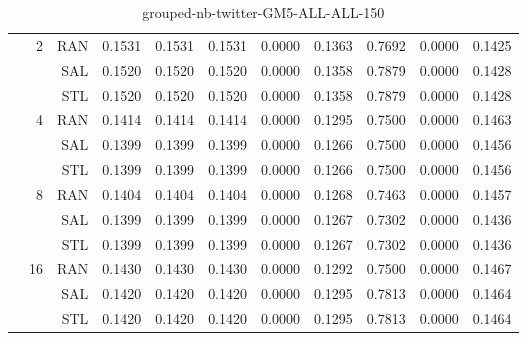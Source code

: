 \begin{center}
\begin{table}[htbp]
\begin{center}
\begin{tabular}{ | r | r | r | r | r | r | r | r | r | r | r |}
 & \multirow{3}{*}{2} & RAN & 0.1531 & 0.1531 & 0.1531 & 0.0000 & 0.1363 & 0.7692 & 0.0000 & 0.1425\\ \cline{3-11}
 &   & SAL & 0.1520 & 0.1520 & 0.1520 & 0.0000 & 0.1358 & 0.7879 & 0.0000 & 0.1428\\ \cline{3-11}
 &   & STL & 0.1520 & 0.1520 & 0.1520 & 0.0000 & 0.1358 & 0.7879 & 0.0000 & 0.1428\\ \cline{2-11}
 & \multirow{3}{*}{4} & RAN & 0.1414 & 0.1414 & 0.1414 & 0.0000 & 0.1295 & 0.7500 & 0.0000 & 0.1463\\ \cline{3-11}
 &   & SAL & 0.1399 & 0.1399 & 0.1399 & 0.0000 & 0.1266 & 0.7500 & 0.0000 & 0.1456\\ \cline{3-11}
 &   & STL & 0.1399 & 0.1399 & 0.1399 & 0.0000 & 0.1266 & 0.7500 & 0.0000 & 0.1456\\ \cline{2-11}
 & \multirow{3}{*}{8} & RAN & 0.1404 & 0.1404 & 0.1404 & 0.0000 & 0.1268 & 0.7463 & 0.0000 & 0.1457\\ \cline{3-11}
 &   & SAL & 0.1399 & 0.1399 & 0.1399 & 0.0000 & 0.1267 & 0.7302 & 0.0000 & 0.1436\\ \cline{3-11}
 &   & STL & 0.1399 & 0.1399 & 0.1399 & 0.0000 & 0.1267 & 0.7302 & 0.0000 & 0.1436\\ \cline{2-11}
 & \multirow{3}{*}{16} & RAN & 0.1430 & 0.1430 & 0.1430 & 0.0000 & 0.1292 & 0.7500 & 0.0000 & 0.1467\\ \cline{3-11}
 &   & SAL & 0.1420 & 0.1420 & 0.1420 & 0.0000 & 0.1295 & 0.7813 & 0.0000 & 0.1464\\ \cline{3-11}
 &   & STL & 0.1420 & 0.1420 & 0.1420 & 0.0000 & 0.1295 & 0.7813 & 0.0000 & 0.1464\\ \cline{2-11}
\hline
\end{tabular}
\caption{grouped-nb-twitter-GM5-ALL-ALL-150}
\end{center}
 \end{table}
\end{center}

